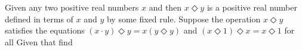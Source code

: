 Given any two positive real numbers $x$ and  then $x\Diamond y$ is a positive real number defined in terms of $x$ and $y$ by some fixed rule.  Suppose the operation $x\Diamond y$ satisfies the equations $(x\cdot y)\Diamond y=x(y\Diamond y)$ and $(x\Diamond 1)\Diamond x=x\Diamond 1$ for all   Given that  find 